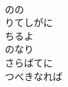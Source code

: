 \documentclass[10pt,b5j]{tarticle} %
\begin{document}
\begin{enumerate}
\begin{minipage}[c]{\blocksize}
    \end{minipage}
    \begin{minipage}[c]{\blocksize}
        
        \vspace{\linespace}
        \item~\\
        のの\\
        りてしがに\\
        ちるよ\\
        のなり\\
        さらばてに\\
        つべきなれば
    
    \end{minipage}
\end{enumerate} %
\end{document}
